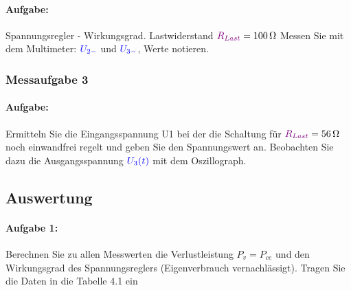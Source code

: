 \documentclass[11pt,a4paper,titlepage]{scrreprt}
\newcommand{\spannung}[1]{\textcolor{blue}{#1}}
\newcommand{\widerstand}[1]{\textcolor{violet}{#1}}
\begin{document}
            \paragraph{Aufgabe:} Spannungsregler - Wirkungsgrad. Lastwiderstand $\widerstand{R_{Last}} = \SI{100}{\ohm}$ Messen Sie mit dem  Multimeter: $\spannung{U_{2-}}$ und $\spannung{U_{3-}}$, Werte notieren.
            
            \subsubsection{Messaufgabe 3}
            \paragraph{Aufgabe:}  Ermitteln Sie die Eingangsspannung U1 bei der die Schaltung für $\widerstand{R_{Last}} = \SI{56}{\ohm}$ noch einwandfrei regelt und geben Sie den Spannungswert an. Beobachten Sie dazu die Ausgangsspannung $\spannung{U_3(t)}$ mit dem Oszillograph.
            
            \subsection{Auswertung}
        	\paragraph{Aufgabe 1: }  Berechnen Sie zu allen Messwerten die Verlustleistung $P_v = P_{ce}$ und den Wirkungsgrad des Spannungsreglers (Eigenverbrauch vernachlässigt). Tragen Sie die Daten in die Tabelle 4.1 ein\\
            
           \listoftables
           \listoffigures
\end{document}
